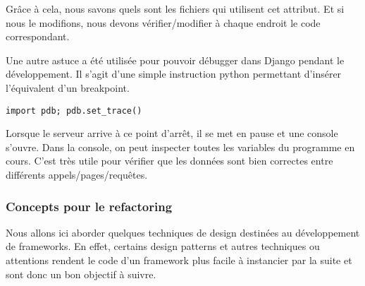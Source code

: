 Grâce à cela,  nous savons quels sont les fichiers qui utilisent cet attribut.  Et si nous le modifions,  nous devons vérifier/modifier à chaque endroit le code correspondant. 

Une autre astuce a été utilisée pour pouvoir débugger dans Django pendant le développement.  Il s'agit d'une simple instruction python permettant d'insérer l'équivalent d'un breakpoint. 
\begin{lstlisting}
import pdb; pdb.set_trace()
\end{lstlisting}
Lorsque le serveur arrive à ce point d'arrêt,  il se met en pause et une console s'ouvre.  
Dans la console,  on peut inspecter toutes les variables du programme en cours.  C'est très utile pour vérifier que les données sont bien correctes entre différents appels/pages/requêtes.

\subsubsection{Concepts pour le refactoring}

Nous allons ici aborder quelques techniques de design destinées au développement de frameworks.  En effet,  certains design patterns et autres techniques ou attentions rendent le code d'un framework plus facile à instancier par la suite et sont donc un bon objectif à suivre.

